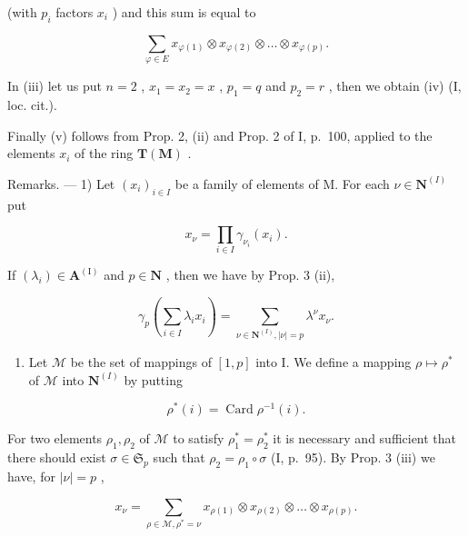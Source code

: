 (with \(p_i\) factors \(x_i\) ) and this sum is equal to

\[
\sum_ {\varphi \in E} x _ {\varphi (1)} \otimes x _ {\varphi (2)} \otimes \dots \otimes x _ {\varphi (p)}.
\]

In (iii) let us put \(n = 2\) , \(x_{1} = x_{2} = x\) , \(p_{1} = q\) and \(p_{2} = r\) , then we obtain (iv) (I, loc. cit.).

Finally (v) follows from Prop. 2, (ii) and Prop. 2 of I, p.~100, applied to the elements \(x_{i}\) of the ring \(\mathbf{T}(\mathbf{M})\) .

Remarks. --- 1) Let \((x_{i})_{i\in I}\) be a family of elements of M. For each \(\nu \in \mathbf{N}^{(I)}\) put

\[
x _ {\nu} = \prod_ {i \in I} \gamma_ {\nu_ {i}} (x _ {i}).
\]

If \((\lambda_{i})\in \mathbf{A}^{(\mathrm{I})}\) and \(p\in \mathbf{N}\) , then we have by Prop. 3 (ii),

\[
\gamma_ {p} \left(\sum_ {i \in I} \lambda_ {i} x _ {i}\right) = \sum_ {\nu \in \mathbf {N} ^ {(I)}, | \nu | = p} \lambda^ {\nu} x _ {\nu}.\tag{6}
\]

\begin{enumerate}
\def\labelenumi{\arabic{enumi})}
\setcounter{enumi}{1}
\tightlist
\item
  Let \(\mathcal{M}\) be the set of mappings of \([1, p]\) into I. We define a mapping \(\rho \mapsto \rho^{*}\) of \(\mathcal{M}\) into \(\mathbf{N}^{(I)}\) by putting
\end{enumerate}

\[
\rho^ {*} (i) = \operatorname{Card} \rho^ {- 1} (i).
\]

For two elements \(\rho_1, \rho_2\) of \(\mathcal{M}\) to satisfy \(\rho_1^* = \rho_2^*\) it is necessary and sufficient that there should exist \(\sigma \in \mathfrak{S}_p\) such that \(\rho_2 = \rho_1 \circ \sigma\) (I, p.~95). By Prop. 3 (iii) we have, for \(|\nu| = p\) ,

\[
x _ {\nu} = \sum_ {\rho \in \mathcal {M}, \rho^ {*} = \nu} x _ {\rho (1)} \otimes x _ {\rho (2)} \otimes \dots \otimes x _ {\rho (p)}.\tag{7}
\]

